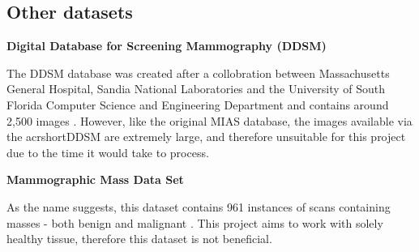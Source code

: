 \subsection{Other datasets}

\noindent \textbf{Digital Database for Screening Mammography (DDSM)}

The \acrshort{DDSM} database was created after a collobration between Massachusetts General Hospital, Sandia National Laboratories and the University of South Florida Computer Science and Engineering Department and contains around 2,500 images \cite{Heath_Bowyer_Kopans_Moore_Kegelmeyer_Processing} \cite{Heath_Bowyer_Kopans_Kegelmeyer_Moore_Chang_MunishKumaran_1998}.
However, like the original \acrshort{MIAS} database, the images available via the acrshort{DDSM} are extremely large, and therefore unsuitable for this project due to the time it would take to process.

\noindent \textbf{Mammographic Mass Data Set}

As the name suggests, this dataset contains 961 instances of scans containing masses - both benign and malignant \cite{Elter_Schulz-Wendtland_Wittenberg_2007}. This project aims to work with solely healthy tissue, therefore this dataset is not beneficial.
